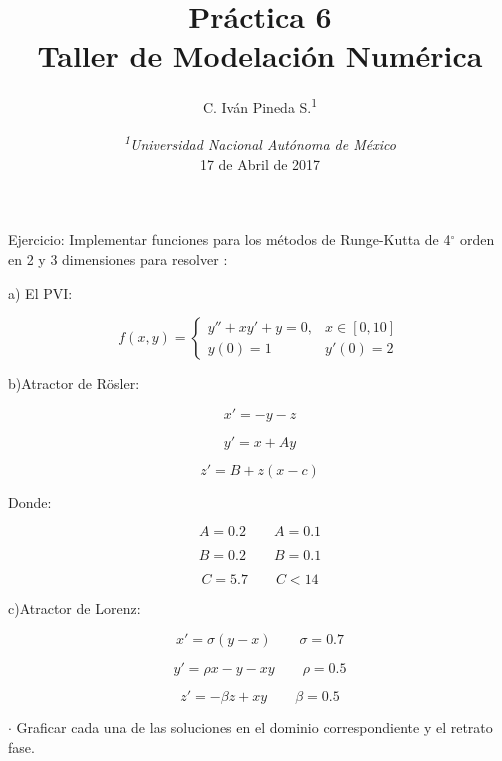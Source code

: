 \documentclass[12pt,letterpaper]{article}
\author{C. Iván Pineda S.\textsuperscript{1} }
\title{Práctica 6\\ Taller de Modelación Numérica}
\date {\textit{\textsuperscript{1}Universidad Nacional Autónoma de México}
\\ 17 de Abril de 2017}
\begin{document}
\maketitle

Ejercicio: Implementar funciones para los métodos de Runge-Kutta de 4$^{\circ}$
orden en 2 y 3 dimensiones para resolver :

a) El PVI:

\[
f(x,y) = \left\lbrace
\begin{array}{ll}
y''+xy'+y=0, & x\in[0,10] \\
y(0)=1  & y'(0)=2
\end{array}
\right.
\]

b)Atractor de Rösler:

\[
x'=-y-z
\]

\[
y'=x+Ay
\]

\[
z'=B+z(x-c)
\]

Donde:

\[
A=0.2 \qquad A=0.1
\]

\[
B=0.2 \qquad B=0.1
\]

\[
C=5.7 \qquad C<14
\]

c)Atractor de Lorenz:

\[
x'=\sigma (y-x) \qquad \sigma=0.7
\]

\[
y'=\rho x-y-xy \qquad \rho=0.5
\]

\[
z'=-\beta z+xy \qquad \beta=0.5
\]

$\cdot$ Graficar cada una de las soluciones en el dominio correspondiente y el
retrato fase.
\end{document}
